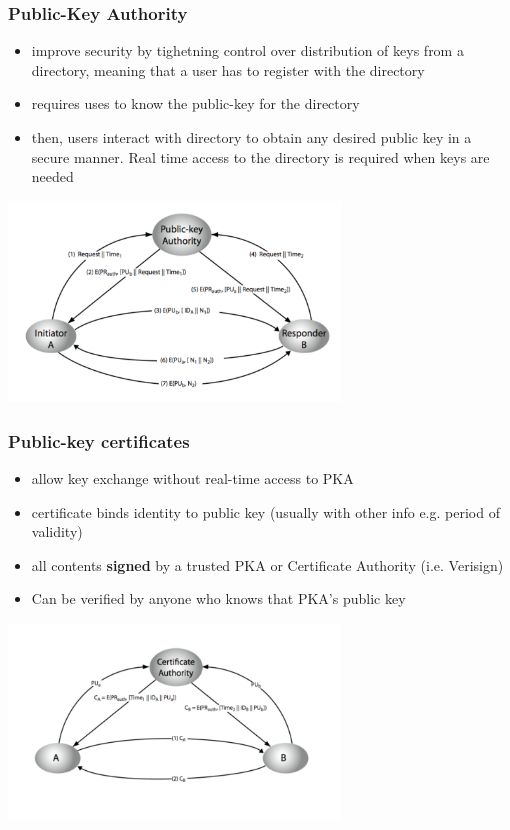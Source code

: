 \documentclass{article}
\begin{document}
\subsubsection{Public-Key Authority}
\begin{itemize}
    \item improve security by tighetning control over distribution of keys from a directory, meaning that a user has to register with the directory
    \item requires uses to know the public-key for the directory
    \item then, users interact with directory to obtain any desired public key in a secure manner. Real time access to the directory is required when keys are needed
\end{itemize}
\includegraphics[width= 250pt]{pka.png}
\subsubsection{Public-key certificates}
\begin{itemize}
    \item allow key exchange without real-time access to PKA
    \item certificate binds identity to public key (usually with other info e.g. period of validity)
    \item all contents \textbf{signed} by a trusted PKA or Certificate Authority (i.e. Verisign)
    \item Can be verified by anyone who knows that PKA's public key
\end{itemize}
\includegraphics[width= 250pt]{ca.png}
\end{document}
